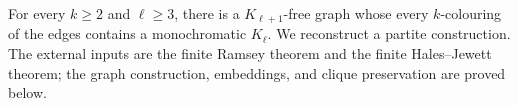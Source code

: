 For every \(k\geq2\) and \(\ell\geq3\), there is a \(K_{\ell+1}\)-free graph whose every \(k\)-colouring of the edges contains a monochromatic \(K_\ell\).
We reconstruct a partite construction. The external inputs are the finite Ramsey theorem and the finite Hales--Jewett theorem; the graph construction, embeddings, and clique preservation are proved below.
